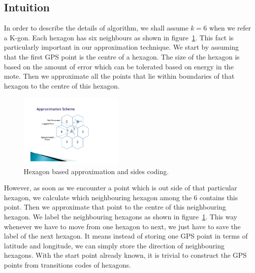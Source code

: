 \documentclass[conference]{IEEEtran}
\begin{document}
\subsection{Intuition}
\label{subs:Intution}
In order to describe the details of algorithm, we shall assume $k = 6$ when we refer a K-gon. Each hexagon has six neighbours as shown in figure~\ref{fig:multiple-hexagons}. This fact is particularly important in our approximation technique. We start by assuming that the first GPS point is the centre of  a hexagon. The size of the hexagon is based on the amount of error which can be tolerated based on energy in the mote. Then we approximate all the points that lie within boundaries of that hexagon to the centre of this hexagon. 
\begin{figure}[ht]
\centering
  \includegraphics[width=2in]{images/hexagon-figure.pdf}
  \caption {Hexagon based approximation and sides coding.}\label{fig:multiple-hexagons}
\end{figure}
However, as soon as we encounter a point which is out side of that particular hexagon, we calculate which neighbouring hexagon among the 6 contains this point. Then we approximate that point to the centre of this neighbouring hexagon. We label the neighbouring hexagons as shown in figure~\ref{fig:multiple-hexagons}. This way whenever we have to move from one hexagon to next, we just have to save the label of the next hexagon. It means instead of storing one GPS point in terms of latitude and longitude, we can simply store the direction of neighbouring hexagons. With the start point already known, it is trivial to construct the GPS points from transitions codes of hexagons.
\end{document}
